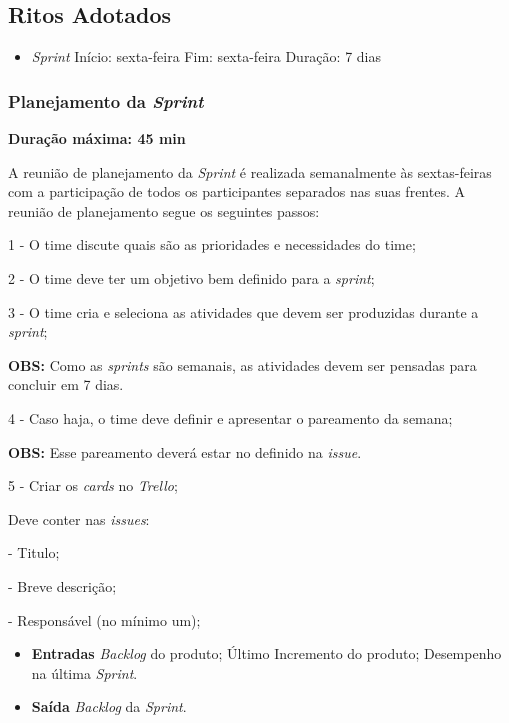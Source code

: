 \subsection{Ritos Adotados}
\label{ritos}
\begin{itemize}
    \item \textit{Sprint}
        \subitem Início: sexta-feira
        \subitem Fim: sexta-feira
        \subitem Duração: 7 dias
\end{itemize}

\subsubsection{Planejamento da \textit{Sprint}}

\textbf{Duração máxima: 45 min}

A reunião de planejamento da  \textit{Sprint} é realizada semanalmente às sextas-feiras com a participação de todos os participantes separados nas suas frentes. A reunião de planejamento segue os seguintes passos:


1 - O time discute quais são as prioridades e necessidades do time;

2 - O time deve ter um objetivo bem definido para a  \textit{sprint};

3 - O time cria e seleciona as atividades que devem ser produzidas durante a  \textit{sprint};

\textbf{OBS:} Como as  \textit{sprints} são semanais, as atividades devem ser pensadas para concluir em 7 dias.

4 - Caso haja, o time deve definir e apresentar o pareamento da semana;

\textbf{OBS:} Esse pareamento deverá estar no definido na  \textit{issue}.

5 - Criar os  \textit{cards} no  \textit{Trello};

Deve conter nas  \textit{issues}:

- Titulo;

- Breve descrição;

- Responsável (no mínimo um);


\begin{itemize}
    \item\textbf{Entradas}
        \subitem \textit{Backlog} do produto;
        \subitem Último Incremento do produto;
        \subitem Desempenho na última \textit{Sprint}.
    
    \item\textbf{Saída}
        \subitem \textit{Backlog} da \textit{Sprint}.
\end{itemize}   


